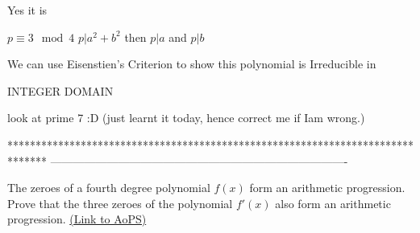 


\begin{solution}
	Yes it is
\end{solution}






\begin{solution}
	$p \equiv 3 \mod 4$ $p|a^2+b^2$ then $p|a$ and $p|b$
\end{solution}



\begin{solution}
	We can use Eisenstien's Criterion to show this polynomial is Irreducible in \begin{bolded}INTEGER DOMAIN\end{bolded} look at prime 7 :D (just learnt it today, hence correct me if Iam wrong.)
\end{solution}
*******************************************************************************
-------------------------------------------------------------------------------

\begin{problem}
	The zeroes of a fourth degree polynomial $f(x)$ form an arithmetic progression. Prove that the three zeroes of the polynomial $f'(x)$ also form an arithmetic progression.
	\flushright \href{https://artofproblemsolving.com/community/c6h1570794}{(Link to AoPS)}
\end{problem}



